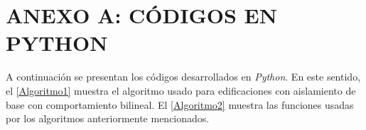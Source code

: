\section*{ANEXO A: CÓDIGOS EN PYTHON}
{}
A continuación se presentan los códigos desarrollados en \textit{Python}. En este sentido, el \autoref{Algoritmo1} muestra el algoritmo usado para edificaciones con aislamiento de base con comportamiento bilineal. El \autoref{Algoritmo2} muestra las funciones usadas por los algoritmos anteriormente mencionados.

\vspace*{2mm}



